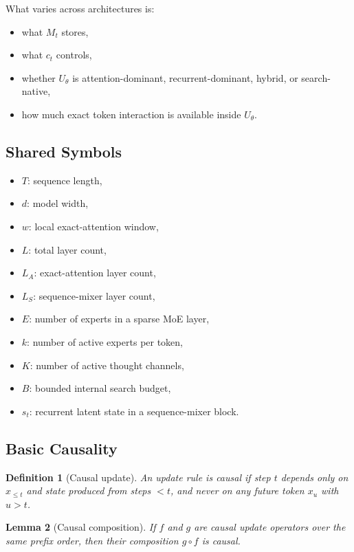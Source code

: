 \documentclass[11pt]{article}
\newtheorem{definition}{Definition}[section]
\newtheorem{lemma}[definition]{Lemma}
\begin{document}
What varies across architectures is:
\begin{itemize}
  \item what $M_t$ stores,
  \item what $c_t$ controls,
  \item whether $U_\theta$ is attention-dominant, recurrent-dominant, hybrid,
    or search-native,
  \item how much exact token interaction is available inside $U_\theta$.
\end{itemize}

\subsection{Shared Symbols}

\begin{itemize}
  \item $T$: sequence length,
  \item $d$: model width,
  \item $w$: local exact-attention window,
  \item $L$: total layer count,
  \item $L_A$: exact-attention layer count,
  \item $L_S$: sequence-mixer layer count,
  \item $E$: number of experts in a sparse MoE layer,
  \item $k$: number of active experts per token,
  \item $K$: number of active thought channels,
  \item $B$: bounded internal search budget,
  \item $s_t$: recurrent latent state in a sequence-mixer block.
\end{itemize}

\subsection{Basic Causality}

\begin{definition}[Causal update]
An update rule is \emph{causal} if step $t$ depends only on $x_{\le t}$ and
state produced from steps $< t$, and never on any future token $x_u$ with
$u > t$.
\end{definition}

\begin{lemma}[Causal composition]
If $f$ and $g$ are causal update operators over the same prefix order, then
their composition $g \circ f$ is causal.
\end{lemma}
\end{document}
